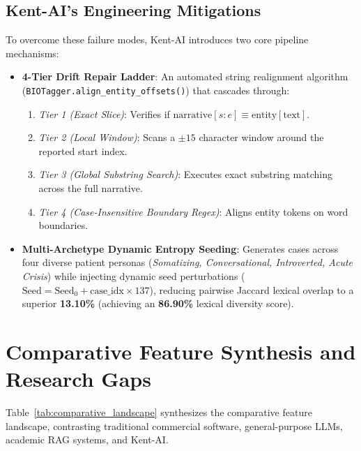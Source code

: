 \begin{sloppypar}
\subsection{Kent-AI's Engineering Mitigations}
To overcome these failure modes, Kent-AI introduces two core pipeline mechanisms:
\begin{itemize}
    \item \textbf{4-Tier Drift Repair Ladder}: An automated string realignment algorithm (\texttt{BIOTagger.align\_entity\_offsets()}) that cascades through:
    \begin{enumerate}
        \item \emph{Tier 1 (Exact Slice)}: Verifies if $\text{narrative}[s:e] \equiv \text{entity}[\text{text}]$.
        \item \emph{Tier 2 (Local Window)}: Scans a $\pm 15$ character window around the reported start index.
        \item \emph{Tier 3 (Global Substring Search)}: Executes exact substring matching across the full narrative.
        \item \emph{Tier 4 (Case-Insensitive Boundary Regex)}: Aligns entity tokens on word boundaries.
    \end{enumerate}
    \item \textbf{Multi-Archetype Dynamic Entropy Seeding}: Generates cases across four diverse patient personas (\emph{Somatizing, Conversational, Introverted, Acute Crisis}) while injecting dynamic seed perturbations ($\text{Seed} = \text{Seed}_0 + \text{case\_idx} \times 137$), reducing pairwise Jaccard lexical overlap to a superior \textbf{13.10\%} (achieving an \textbf{86.90\%} lexical diversity score).
\end{itemize}

\section{Comparative Feature Synthesis and Research Gaps}
Table~\ref{tab:comparative_landscape} synthesizes the comparative feature landscape, contrasting traditional commercial software, general-purpose LLMs, academic RAG systems, and Kent-AI.


\end{sloppypar}
